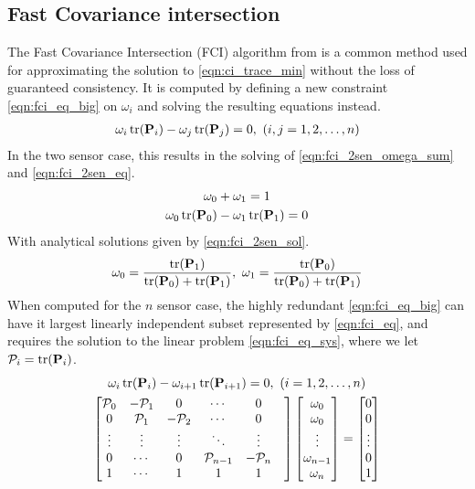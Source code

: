 \documentclass[letterpaper, 10 pt, conference]{ieeeconf}  %
\begin{document}
\subsection{Fast Covariance intersection}
The Fast Covariance Intersection (FCI) algorithm from \cite{niehsenInformationFusionBased2002} is a common method used for approximating the solution to \eqref{eqn:ci_trace_min} without the loss of guaranteed consistency. It is computed by defining a new constraint \eqref{eqn:fci_eq_big} on $\omega_i$ and solving the resulting equations instead.
\begin{gather}
   \omega_i \operatorname{tr}({{\mathbf{P}}}_i) - \omega_j \operatorname{tr}({{\mathbf{P}}}_j) = 0,\ (i,j=1,2,\dots,n) \label{eqn:fci_eq_big}
\end{gather}
In the two sensor case, this results in the solving of \eqref{eqn:fci_2sen_omega_sum} and \eqref{eqn:fci_2sen_eq}.
\begin{gather}
   \omega_0 + \omega_1 = 1 \label{eqn:fci_2sen_omega_sum}\\
   \omega_0 \operatorname{tr}({{\mathbf{P}}}_0) - \omega_1 \operatorname{tr}({{\mathbf{P}}}_1) = 0 \label{eqn:fci_2sen_eq}
\end{gather}
With analytical solutions given by \eqref{eqn:fci_2sen_sol}.
\begin{gather}
   \omega_0 = \frac{\operatorname{tr}({{\mathbf{P}}}_1)}{\operatorname{tr}({{\mathbf{P}}}_0)+\operatorname{tr}({{\mathbf{P}}}_1)},\ \omega_1 = \frac{\operatorname{tr}({{\mathbf{P}}}_0)}{\operatorname{tr}({{\mathbf{P}}}_0)+\operatorname{tr}({{\mathbf{P}}}_1)} \label{eqn:fci_2sen_sol}
\end{gather}
When computed for the $n$ sensor case, the highly redundant \eqref{eqn:fci_eq_big} can have it largest linearly independent subset represented by \eqref{eqn:fci_eq}, and requires the solution to the linear problem \eqref{eqn:fci_eq_sys}, where we let $\mathcal{P}_i = \operatorname{tr}({{\mathbf{P}}}_i)$.
\begin{gather}
   \omega_i \tr(\mP_i) - \omega_{i+1} \tr(\mP_{i+1}) = 0,\ (i=1,2,\dots,n) \label{eqn:fci_eq}\\
   \begin{bmatrix}
      \mathcal{P}_0 & -\mathcal{P}_1 & 0 & \cdots & 0 \\
      0 & \mathcal{P}_1 & -\mathcal{P}_2 & \cdots & 0 \\
      \vdots & \vdots & \vdots & \ddots & \vdots & \\
      0 & \cdots & 0 & \mathcal{P}_{n-1} & -\mathcal{P}_n \\
      1 & \cdots & 1 & 1 & 1 &
   \end{bmatrix}
   \begin{bmatrix}
      \omega_0 \\
      \omega_0 \\
      \vdots \\
      \omega_{n-1} \\
      \omega_n
   \end{bmatrix}
   =
   \begin{bmatrix}
      0 \\
      0 \\
      \vdots \\
      0 \\
      1
   \end{bmatrix} \label{eqn:fci_eq_sys}
\end{gather}
\end{document}

